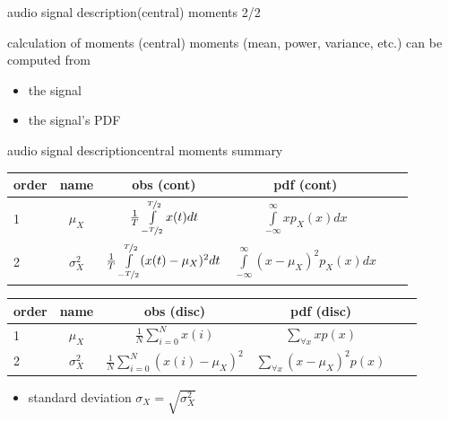 \begin{frame}{audio signal description}{(central) moments 2/2}
	\toremember{}
	\begin{block}{calculation of moments}
		\centering
		(central) moments (mean, power, variance, etc.) can be computed from 
		\begin{itemize}
			\item	the signal
			\item	the signal's PDF 
		\end{itemize}		
	\end{block}
\end{frame}		

\begin{frame}{audio signal description}{central moments summary}
    \begin{footnotesize}
     \begin{table}
         \centering
             \begin{tabular}{lccccc}
                 order & name & obs (cont) & pdf (cont) & \\\hline
                1 & $\mu_X$ & $\frac{1}{T}\int\limits_{-\nicefrac{T}{2}}^{\nicefrac{T}{2}} x(t)dt$ & $\int\limits_{-\infty}^{\infty}{xp_X(x)dx}$  \\
                2 & $\sigma_X^2$ & $\frac{1}{T}\int\limits_{-\nicefrac{T}{2}}^{\nicefrac{T}{2}}(x(t)-\mu_X)^2dt$ & $\int\limits_{-\infty}^{\infty} (x-\mu_X)^2p_X(x)dx$  \\
             \end{tabular}
     \end{table}
     \begin{table}
         \centering
             \begin{tabular}{lccccc}
                 order & name  & obs (disc) & pdf (disc)\\\hline
                1 & $\mu_X$         &  $\frac{1}{N}\sum\limits_{i=0}^{N} x(i)$              & $\sum\limits_{\forall x} x p(x)$ \\
                2 & $\sigma_X^2$    &  $\frac{1}{N}\sum\limits_{i=0}^{N} (x(i)-\mu_X)^2$    & $\sum\limits_{\forall x} (x-\mu_X)^2p(x)$ \\
             \end{tabular}
     \end{table}
    \end{footnotesize}
    \begin{itemize}
        \item[] standard deviation $\sigma_X = \sqrt{\sigma_X^2}$
    \end{itemize}
\end{frame}		

